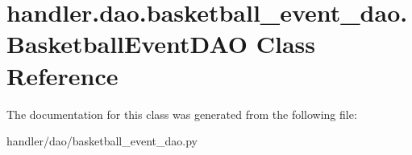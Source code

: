 \hypertarget{classhandler_1_1dao_1_1basketball__event__dao_1_1_basketball_event_d_a_o}{}\section{handler.\+dao.\+basketball\+\_\+event\+\_\+dao.\+Basketball\+Event\+D\+AO Class Reference}
\label{classhandler_1_1dao_1_1basketball__event__dao_1_1_basketball_event_d_a_o}


The documentation for this class was generated from the following file\+:\begin{DoxyCompactItemize}
\item 
handler/dao/basketball\+\_\+event\+\_\+dao.\+py\end{DoxyCompactItemize}
